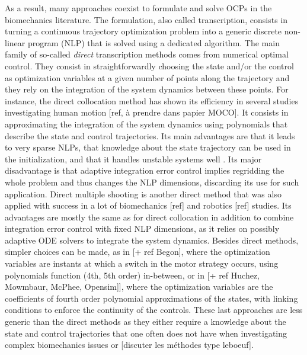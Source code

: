 As a result, many approaches coexist to formulate and solve OCPs in the biomechanics literature. 
The formulation, also called transcription, consists in turning a continuous trajectory optimization problem into a generic discrete non-linear program (NLP) that is solved using a dedicated algorithm. 
The main family of so-called \textit{direct} transcription methods comes from numerical optimal control. 
They consist in straightforwardly choosing the state and/or the control as optimization variables at a given number of points along the trajectory and they rely on the integration of the system dynamics between these points. 
For instance, the direct collocation method has shown its efficiency in several studies investigating human motion [ref, à prendre dans papier MOCO]. 
It consists in approximating the integration of the system dynamics using polynomials that describe the state and control trajectories.
Its main advantages are that it leads to very sparse NLPs, that knowledge about the state trajectory can be used in the initialization, and that it handles unstable systems well \cite{diehl2006fast}. 
Its major disadvantage is that adaptive integration error control implies regridding the whole problem and thus changes the NLP dimensions, discarding its use for such application.
Direct multiple shooting is another direct method that was also applied with success in a lot of biomechanics [ref] and robotics [ref] studies.
Its advantages are mostly the same as for direct collocation in addition to combine integration error control with fixed NLP dimensions, as it relies on possibly adaptive ODE solvers to integrate the system dynamics.
Besides direct methods, simpler choices can be made, as in \cite{yeadon2000mechanics} [+ ref Begon], where the optimization variables are instants at which a switch in the motor strategy occurs, using polynomials function (4th, 5th order) in-between, or in \cite{leboeuf2006energetic} [+ ref  Huchez, Mowmbaur, McPhee, Opensim]], where the optimization variables are the coefficients of fourth order polynomial approximations of the states, with linking conditions to enforce the continuity of the controls. 
These last approaches are less generic than the direct methods as they either require a knowledge about the state and control trajectories that one often does not have when investigating complex biomechanics issues or [discuter les méthodes type leboeuf]. 

